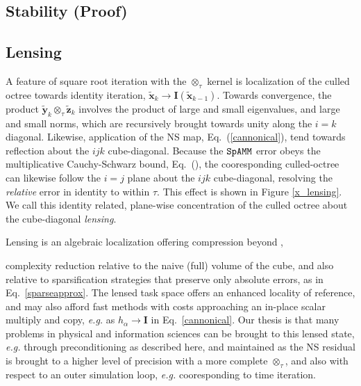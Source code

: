 \documentclass[letterpaper,twocolumn,amsmath,amsfont,amssymb,english,aps,jcp,preprintnumbers,groupaddress,nofootinbib,tightenlines]{revtex4}
\newcommand{\mat}[1]{\boldsymbol{#1}}
\newcommand{\ot}{ {\scriptstyle \otimes}_{ \tau } }
\begin{document}
\subsection{Stability (Proof)}


\subsection{Lensing}
A feature of square root iteration with the $\ot$ kernel is localization of the culled octree towards identity iteration, 
$\widetilde{\mat{x}}_k \rightarrow \mat{I}\left( \widetilde{\mat{x}}_{k-1} \right)$.  Towards convergence,  
the product $\widetilde{\mat{y}}_k \ot \widetilde{\mat{z}}_k$ involves the product of large and small eigenvalues, and large and small norms, 
which are recursively brought towards unity along the $i=k$ diagonal.  Likewise, application of the NS map, Eq.~(\ref{cannonical}),  tend towards 
reflection about the $ijk$ cube-diagonal.   Because the $\tt SpAMM$ error obeys the multiplicative Cauchy-Schwarz bound, Eq.~(),  the 
cooresponding culled-octree can likewise follow the $i=j$ plane about the $ijk$ cube-diagonal, resolving the {\em relative} error in identity to within $\tau$.    This effect is shown in Figure \ref{x_lensing}.   
We call this identity related,  plane-wise concentration of the culled octree  about the cube-diagonal {\em lensing}.  

Lensing is an algebraic localization offering compression beyond  , 

complexity reduction relative to the naive (full) volume of the cube,
and also relative to sparsification strategies that preserve only absolute errors, as in Eq.~\ref{sparseapprox}.  
The lensed task space offers an enhanced locality of reference, and may also afford fast methods 
with costs approaching an in-place scalar multiply and copy, {\em e.g.} as $h_\alpha \rightarrow \mat{I}$ in Eq.~\ref{cannonical}.
Our thesis is that many problems in physical and information sciences can be brought to this lensed state, {\em e.g.} through preconditioning
as described here, and maintained as the NS residual is brought to a higher level of precision with a more complete $\ot$, 
and also with respect to an outer simulation loop, {\em e.g.} cooresponding to time iteration.
\end{document}
